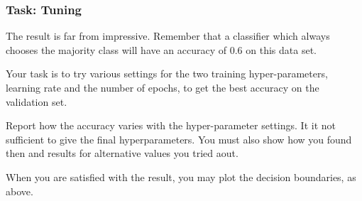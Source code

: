 \documentclass[a4paper,landscape]{article}
\begin{document}
    \subsubsection{Task: Tuning}\label{task-tuning}

The result is far from impressive. Remember that a classifier which
always chooses the majority class will have an accuracy of 0.6 on this
data set.

Your task is to try various settings for the two training
hyper-parameters, learning rate and the number of epochs, to get the
best accuracy on the validation set.

Report how the accuracy varies with the hyper-parameter settings. It it
not sufficient to give the final hyperparameters. You must also show how
you found then and results for alternative values you tried aout.

When you are satisfied with the result, you may plot the decision
boundaries, as above.
\end{document}
